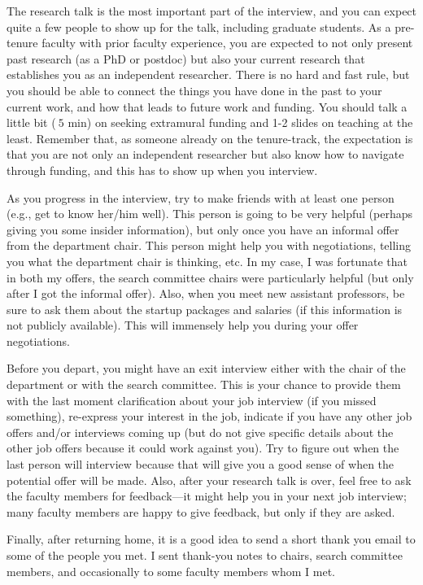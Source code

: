 \documentclass[14pt]{article}
\begin{document}
The research talk is the most important part of the interview, and you can expect quite a few people to show up for the talk, including graduate students. As a pre-tenure faculty with prior faculty experience, you are expected to not only present past research (as a PhD or postdoc) but also your current research that establishes you as an independent researcher. There is no hard and fast rule, but you should be able to connect the things you have done in the past to your current work, and how that leads to future work and funding. You should talk a little bit ($~5$ min) on seeking extramural funding and 1-2 slides on teaching at the least. Remember that, as someone already on the tenure-track, the expectation is that you are not only an independent researcher but also know how to navigate through funding, and this has to show up when you interview.

As you progress in the interview, try to make friends with at least one person (e.g., get to know her/him well). This person is going to be very helpful (perhaps giving you some insider information), but only once you have an informal offer from the department chair. This person might help you with negotiations, telling you what the department chair is thinking, etc. In my case, I was fortunate that in both my offers, the search committee chairs were particularly helpful (but only after I got the informal offer). Also, when you meet new assistant professors, be sure to ask them about the startup packages and salaries (if this information is not publicly available). This will immensely help you during your offer negotiations.

Before you depart, you might have an exit interview either with the chair of the department or with the search committee. This is your chance to provide them with the last moment clarification about your job interview (if you missed something), re-express your interest in the job, indicate if you have any other job offers and/or interviews coming up (but do not give specific details about the other job offers because it could work against you). Try to figure out when the last person will interview because that will give you a good sense of when the potential offer will be made. Also, after your research talk is over, feel free to ask the faculty members for feedback---it might help you in your next job interview; many faculty members are happy to give feedback, but only if they are asked.

Finally, after returning home, it is a good idea to send a short thank you email to some of the people you met. I sent thank-you notes to chairs, search committee members, and occasionally to some faculty members whom I met.  
\end{document}
